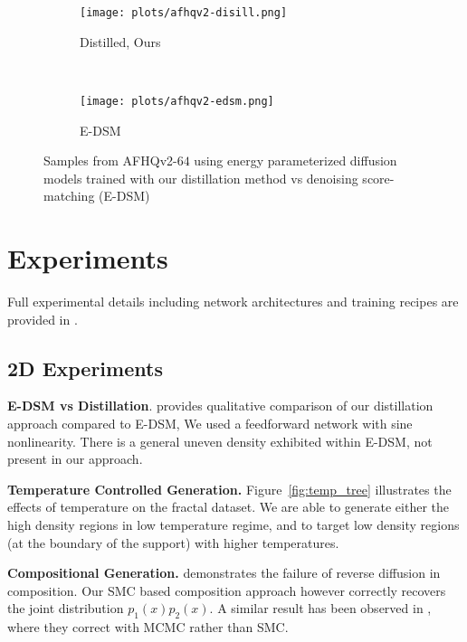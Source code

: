 
\begin{figure}[b]
    \centering
    \begin{subfigure}[t]{0.45\linewidth}
        \centering
        \texttt{[image: plots/afhqv2-disill.png]}
        \caption{Distilled, Ours}
    \end{subfigure}%
    ~
    \begin{subfigure}[t]{0.45\linewidth}
        \centering
        \texttt{[image: plots/afhqv2-edsm.png]}
        \caption{E-DSM}
    \end{subfigure}%
    \caption{Samples from AFHQv2-$64$ using energy parameterized diffusion models trained with our distillation method vs denoising score-matching (E-DSM)} 
    \label{fig:afhq}
\end{figure}
\section{Experiments}
Full experimental details including network architectures and training recipes are provided in .
\subsection{2D Experiments}

\textbf{E-DSM vs Distillation}.  provides qualitative comparison of our distillation approach compared to E-DSM, We used a feedforward network with sine nonlinearity. There is a general uneven density exhibited within E-DSM, not present in our approach.

\textbf{Temperature Controlled Generation.} Figure~\ref{fig:temp_tree} illustrates the effects of temperature on the fractal dataset. We are able to generate either the high density regions in low temperature regime, and to target low density regions (at the boundary of the support) with higher temperatures.   

\textbf{Compositional Generation.}  demonstrates the failure of reverse diffusion in composition. Our SMC based composition approach however correctly recovers the joint distribution $p_1(x)p_2(x)$. A similar result has been observed in \citet{du2023reduce}, where they correct with MCMC rather than SMC.


